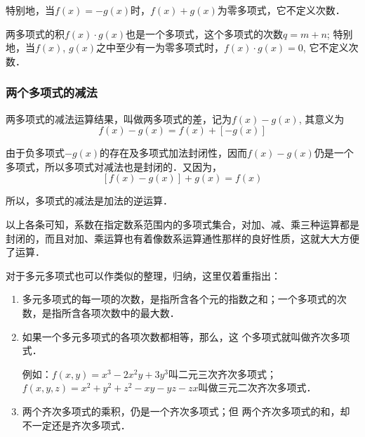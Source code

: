 特别地，当$f(x)=-g(x)$时，$f(x)+g(x)$为零多项式，它不定义次数．

两多项式的积$f(x)\cdot g(x)$也是一个多项式，这个多项式的次数$q=m+n$; 特别地，当$f(x)$, $g(x)$之中至少有一为零多项式时，$f(x)\cdot g(x)=0$, 它不定义次数．

\subsubsection{两个多项式的减法}

两多项式的减法运算结果，叫做两多项式的差，记为$f(x)-g(x)$, 其意义为
\[f (x) -g (x) =f (x) + [-g (x) ]\]

由于负多项式$-g(x)$的存在及多项式加法封闭性，因而$f(x)-g(x)$仍是一个多项式，所以多项式对减法也是封闭的．又因为，
\[[f (x) -g (x) ] +g (x) =f (x) \]

所以，多项式的减法是加法的逆运算．

以上各条可知，系数在指定数系范围内的多项式集合，对加、减、乘三种运算都是封闭的，而且对加、乘运算也有着像数系运算通性那样的良好性质，这就大大方便了运算．

对于多元多项式也可以作类似的整理，归纳，这里仅着重指出：
\begin{enumerate}
    \item 多元多项式的每一项的次数，是指所含各个元的指数之和；一个多项式的次数，是指所含各项次数中的最大数．
    \item 如果一个多元多项式的各项次数都相等，那么，这
个多项式就叫做齐次多项式．

例如：$f(x,y)=x^3-2x^2y+3y^3$叫二元三次齐次多项式；$f(x,y,z)=x^2+y^2+z^2-xy-yz-zx$叫做三元二次齐次多项式．

\item 两个齐次多项式的乘积，仍是一个齐次多项式；但
两个齐次多项式的和，却不一定还是齐次多项式．
\end{enumerate}

